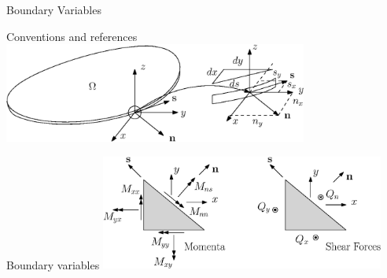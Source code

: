 \documentclass{beamer}
\begin{document}
\begin{frame}{Boundary Variables}

\begin{tcolorbox}
	\centering
	\large{Conventions and references}
	\includegraphics[width=0.75\textwidth]{Plate_ref.eps}
\end{tcolorbox}

\begin{tcolorbox}
	\centering
	\large{Boundary variables}
	\includegraphics[width=0.7\textwidth]{Cauchy_law.eps}
\end{tcolorbox}
\end{frame}
\end{document}
